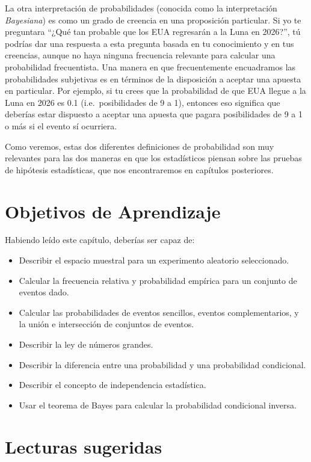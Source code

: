 \documentclass[
  12pt,
]{book}
\providecommand{\tightlist}{%
  \setlength{\itemsep}{0pt}\setlength{\parskip}{0pt}}
\begin{document}
La otra interpretación de probabilidades (conocida como la interpretación \emph{Bayesiana}) es como un grado de creencia en una proposición particular. Si yo te preguntara ``¿Qué tan probable que los EUA regresarán a la Luna en 2026?'', tú podrías dar una respuesta a esta pregunta basada en tu conocimiento y en tus creencias, aunque no haya ninguna frecuencia relevante para calcular una probabilidad frecuentista. Una manera en que frecuentemente encuadramos las probabilidades subjetivas es en términos de la disposición a aceptar una apuesta en particular. Por ejemplo, si tu crees que la probabilidad de que EUA llegue a la Luna en 2026 es 0.1 (i.e.~posibilidades de 9 a 1), entonces eso significa que deberías estar dispuesto a aceptar una apuesta que pagara posibilidades de 9 a 1 o más si el evento sí ocurriera.

Como veremos, estas dos diferentes definiciones de probabilidad son muy relevantes para las dos maneras en que los estadísticos piensan sobre las pruebas de hipótesis estadísticas, que nos encontraremos en capítulos posteriores.

\hypertarget{objetivos-de-aprendizaje-5}{%
\section{Objetivos de Aprendizaje}\label{objetivos-de-aprendizaje-5}}

Habiendo leído este capítulo, deberías ser capaz de:

\begin{itemize}
\tightlist
\item
  Describir el espacio muestral para un experimento aleatorio seleccionado.
\item
  Calcular la frecuencia relativa y probabilidad empírica para un conjunto de eventos dado.
\item
  Calcular las probabilidades de eventos sencillos, eventos complementarios, y la unión e intersección de conjuntos de eventos.
\item
  Describir la ley de números grandes.
\item
  Describir la diferencia entre una probabilidad y una probabilidad condicional.
\item
  Describir el concepto de independencia estadística.
\item
  Usar el teorema de Bayes para calcular la probabilidad condicional inversa.
\end{itemize}

\hypertarget{lecturas-sugeridas-3}{%
\section{Lecturas sugeridas}\label{lecturas-sugeridas-3}}
\end{document}
